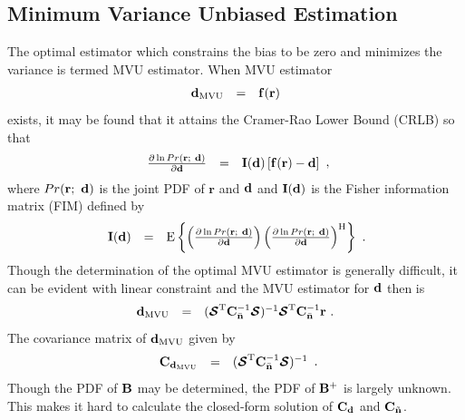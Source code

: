 \documentclass[a4paper,10pt,fleqn, twocolumn]{IEEETran}
\newcommand{\br}{{\mathbf r}}
\newcommand{\bC}{{\bf C}}
\newcommand{\bd}{{\bf d}}
\newcommand{\bn}{{\bf n}}
\newcommand{\bbf}{{\bf d}}
\newcommand{\bI}{{\bf I}}
\newcommand{\bB}{{\bf B}}
\newcommand{\bcS}{{\mbox {\boldmath ${\cal S}$}}}
\begin{document}
\subsection{Minimum Variance Unbiased Estimation}
The optimal estimator which constrains the bias to be zero and
minimizes the variance is termed MVU estimator. When MVU estimator
\begin{equation}
\begin{array}{rcl}
{\bd}_{\rm MVU}&=&{\bf f}(\br)
\end{array}
\end{equation}
exists, it may be found that it attains the Cramer-Rao Lower Bound
(CRLB) so that
\begin{equation}
\begin{array}{rcl}
\frac{\partial\ln Pr(\br;\ \bd)}{\partial\bd}&=&\bI(\bd)\left[{\bf
f}(\br)-\bd\right]
\end{array},
\end{equation}
\noindent where $Pr(\br;\ \bd)$ is the joint PDF of $\br$ and
$\bd$ and $\bI(\bd)$ is the Fisher information matrix (FIM)
defined by
\begin{equation}\hspace{-0.04in}
\begin{array}{rcl}
$\bI(\bd)$ &=& {\rm E} \left\{ \left( \frac{\partial \ln{Pr(\br;\
\bd)}}{\partial \bd} \right) \left( \frac{\partial \ln{Pr(\br;\
\bd)}}{\partial \bd} \right)^{\rm H} \right\}
\end{array}.
\end{equation}
\noindent Though the determination of the optimal MVU estimator is
generally difficult, it can be evident with linear constraint and
the MVU estimator for $\bd$ then is~\cite{Key93}
\begin{equation}
\begin{array}{rcl}
{\bbf}_{\rm MVU}&=&(\bcS^{\rm
T}\bC_{\bar{\bn}}^{-1}\bcS)^{-1}\bcS^{\rm
T}\bC_{\bar{\bn}}^{-1}\br\ .
\end{array} \label{BLUE}
\end{equation}
\noindent The covariance matrix of ${\bbf}_{\rm MVU}$ given by
\begin{equation}
\begin{array}{rcl}
{\bC}_{\bd_{\rm MVU}}&=&(\bcS^{\rm
T}\bC_{\bar{\bn}}^{-1}\bcS)^{-1}
\end{array}.
\end{equation}
\noindent Though the PDF of $\bB$ may be determined, the PDF of
$\bB^{+}$ is largely unknown. This makes it hard to calculate the
closed-form solution of $\bC_{\bd}$ and $\bC_{\tilde{\bn}}$.
\end{document}
